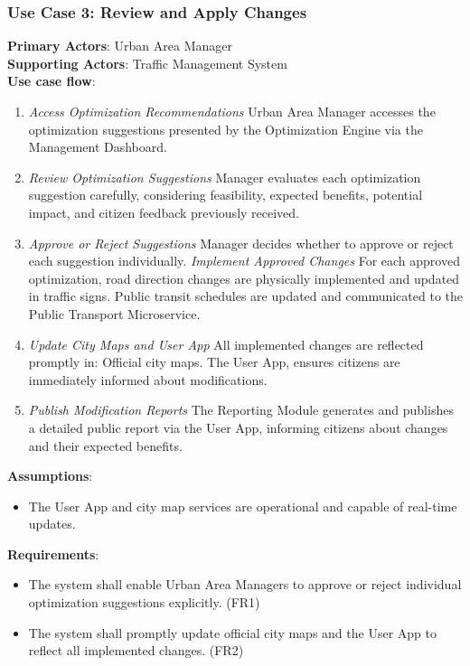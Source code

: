 \documentclass[a4paper,12pt]{article}
\begin{document}
\subsubsection*{Use Case 3: Review and Apply Changes}
\textbf{Primary Actors}: Urban Area Manager \\
\textbf{Supporting Actors}: Traffic Management System \\ 
\textbf{Use case flow}: 
\begin{enumerate}
    \item \textit{Access Optimization Recommendations} Urban Area Manager accesses the optimization suggestions presented by the Optimization Engine via the Management Dashboard.
    \item \textit{Review Optimization Suggestions} Manager evaluates each optimization suggestion carefully, considering feasibility, expected benefits, potential impact, and citizen feedback previously received.
    \item \textit{Approve or Reject Suggestions} Manager decides whether to approve or reject each suggestion individually.
    \Item \textit{Implement Approved Changes} For each approved optimization, road direction changes are physically implemented and updated in traffic signs.
    Public transit schedules are updated and communicated to the Public Transport Microservice.
    \item \textit{Update City Maps and User App} All implemented changes are reflected promptly in: Official city maps.
    The User App, ensures citizens are immediately informed about modifications.
    \item \textit{Publish Modification Reports} The Reporting Module generates and publishes a detailed public report via the User App, informing citizens about changes and their expected benefits.
\end{enumerate}
\textbf{Assumptions}: 
\begin{itemize}
    \item The User App and city map services are operational and capable of real-time updates.
\end{itemize}
\textbf{Requirements}: 
\begin{itemize}
    \item The system shall enable Urban Area Managers to approve or reject individual optimization suggestions explicitly. (FR1)
    \item The system shall promptly update official city maps and the User App to reflect all implemented changes. (FR2)
\end{itemize} 
\end{document}

